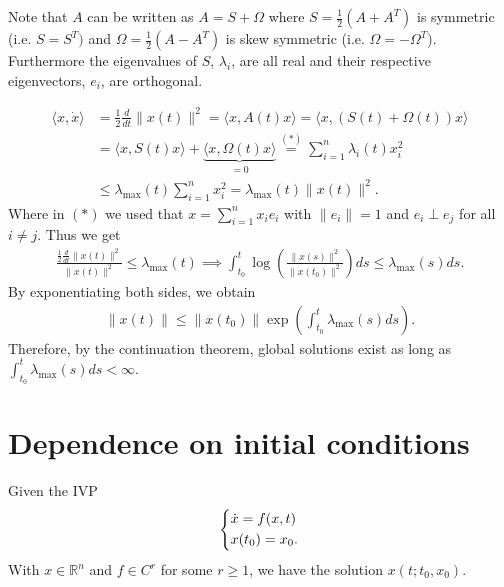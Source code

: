 \begin{remark}[]
	Note that ${A} $ can be written as ${A}={S} +{\Omega }$ where ${S} = \frac{1}{2}({A} + {A}^T)$ is symmetric (i.e. ${S} = {S}^T)$ and ${\Omega} = \frac{1}{2}({A} - {A}^T)$ is skew symmetric (i.e. ${\Omega} = -{\Omega}^T$). Furthermore the eigenvalues of ${S}$, $\lambda_i$, are all real and their respective eigenvectors, $e_i$, are orthogonal.
\end{remark}

\begin{ex}
\begin{align}
	\langle  {x}, \dot{ {x}} \rangle &= \frac{1}{2} \frac{d}{dt}  \| {x}(t) \|^2 = \langle  {x}, {A}(t)  {x}\rangle = \langle  {x}, ({S}(t) + {\Omega}(t) )  {x} \rangle \\
				   &= \langle  {x}, S(t)  {x} \rangle + \underbrace{\langle  {x}, {\Omega}(t)  {x} \rangle}_{=0} \stackrel{(*)}{=} 
				   \sum_{i=1}^{n} \lambda_i(t) x_i^2 \\
				   &\leq \lambda_{ \textrm{max} }(t) \sum_{i=1}^{n} x_i^2 = \lambda _{ \textrm{max} }(t)  \|  {x}(t) \|^2.
\end{align}
Where in $(*)$ we used that $ {x} = \sum_{i=1}^{n} x_i  {e}_i $ with $ \| {e}_i \|=1$ and $ {e}_i \perp  {e}_j$ for all $i \neq j$. Thus we get
\begin{align}
	\frac{\frac{1}{2}\frac{d}{dt} \| {x}(t) \|^2}{ \| {x}(t) \|^2} \leq \lambda_{ \textrm{max} }(t) 
	\implies \int_{t_0}^{t} \log \left( \frac{ \| {x}(s) \|^2}{ \| {x}(t_0) \|^2} \right) ds \leq \lambda _{ \textrm{max} }(s) ds.
\end{align}
By exponentiating both sides, we obtain
\begin{align}
\boxed{  \| {x}(t) \| \leq  \| {x}(t_0)  \| \exp\left(\int_{t_0}^{t} \lambda_{ \textrm{max} }(s)ds\right).}
\end{align}
Therefore, by the continuation theorem, global solutions exist as long as $\int_{t_0}^{t} \lambda_{ \textrm{max} }(s) ds < \infty $.
\end{ex}

\section{Dependence on initial conditions}
Given the IVP
\begin{align}
	\begin{dcases}
	\dot{ {x}} = f( {x},t) \\  {x}(t_0) =  {x}_0.
	\end{dcases}
\end{align}
With $ {x} \in \mathbb{R}^{n}$ and $f\in C^r$ for some $r\geq 1$, we have the solution $ {x}(t; t_0,  {x}_0)$.

